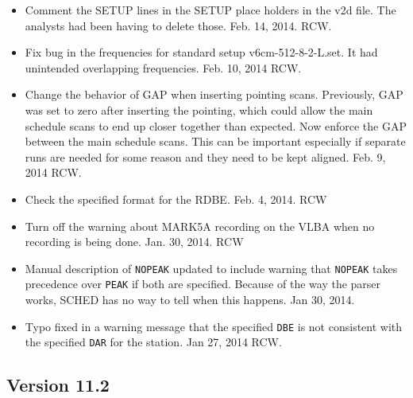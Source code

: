\documentclass{report}
\begin{document}
\begin{itemize}
\item  Comment the SETUP lines in the SETUP place holders in the v2d file.
The analysts had been having to delete those.  Feb. 14, 2014.  RCW.

\item  Fix bug in the frequencies for standard setup v6cm-512-8-2-L.set.  It 
had unintended overlapping frequencies.  Feb. 10, 2014  RCW.

\item  Change the behavior of GAP when inserting pointing scans.  Previously,
GAP was set to zero after inserting the pointing, which could allow the
main schedule scans to end up closer together than expected.  Now enforce 
the GAP between the main schedule scans.  This can be important especially
if separate runs are needed for some reason and they need to be kept aligned.
Feb. 9, 2014  RCW.

\item  Check the specified format for the RDBE.  Feb. 4, 2014. RCW

\item  Turn off the warning about MARK5A recording on the VLBA when
no recording is being done.  Jan. 30, 2014.  RCW

\item  Manual description of {\tt NOPEAK} updated to include warning
that {\tt NOPEAK} takes precedence over {\tt PEAK} if both are specified.
Because of the way the parser works, SCHED has no way to tell when this
happens.  Jan 30, 2014.

\item Typo fixed in a warning message that the specified {\tt DBE}
is not consistent with the specified {\tt DAR} for the station.
Jan 27, 2014  RCW.

\end{itemize}

\subsection{\label{SSEC:VER_11.2}Version 11.2}
\end{document}
